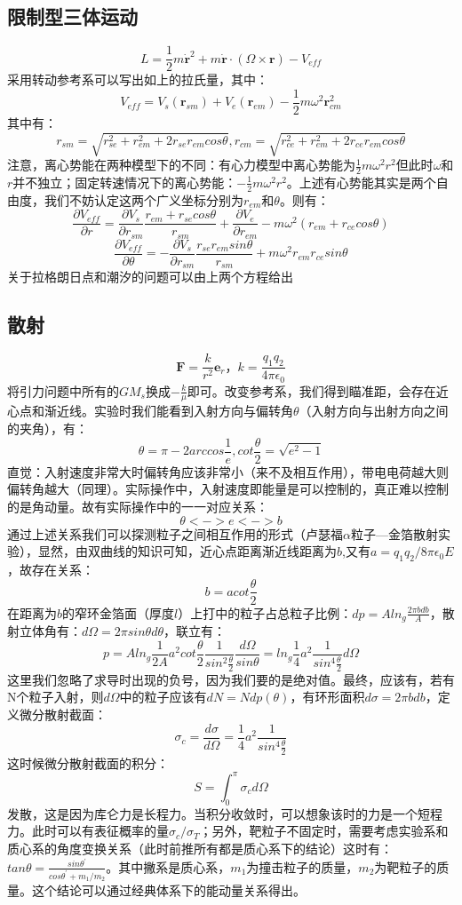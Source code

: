 \documentclass[a4paper, 10pt, openany]{book}%
\begin{document}
    \subsection{限制型三体运动}
    $$L=\frac{1}{2}m\dot{\textbf{r}}^2+m\dot{\textbf{r}}\cdot(\Omega \times{\textbf{r}})-V_{eff}$$
    采用转动参考系可以写出如上的拉氏量，其中：
    $$V_{eff}=V_s(\textbf{r}_{sm})+V_e(\textbf{r}_{em})-\frac{1}{2}m\omega^2\textbf{r}_{cm}^2$$
    其中有：
    $$r_{sm}=\sqrt{r^2_{se}+r^2_{em}+2r_{se}r_{em}cos\theta},r_{cm}=\sqrt{r^2_{ce}+r^2_{em}+2r_{ce}r_{em}cos\theta}$$
    注意，离心势能在两种模型下的不同：有心力模型中离心势能为$\frac{1}{2}m\omega^2r^2$但此时$\omega$和$r$并不独立；固定转速情况下的离心势能：$-\frac{1}{2}m\omega^2r^2$。上述有心势能其实是两个自由度，我们不妨认定这两个广义坐标分别为$r_{em}$和$\theta$。则有：
    $$\frac{\partial V_{eff}}{\partial r}=\frac{\partial V_s}{\partial r_{sm}}\frac{r_{em}+r_{se}cos\theta}{r_{sm}}+\frac{\partial V_e}{\partial r_{em}}-m\omega^2(r_{em}+r_{ce}cos\theta)$$
    $$\frac{\partial V_{eff}}{\partial \theta}=-\frac{\partial V_s}{\partial r_{sm}}\frac{r_{se}r_{em}sin\theta}{r_{sm}}+m\omega^2r_{em}r_{ce}sin\theta$$
    关于拉格朗日点和潮汐的问题可以由上两个方程给出
    \subsection{散射}
    $$\textbf{F}=\frac{k}{r^2}\textbf{e}_r，k=\frac{q_1q_2}{4\pi\epsilon_0}$$
    将引力问题中所有的$GM_s$换成$-\frac{k}{\mu}$即可。改变参考系，我们得到瞄准距，会存在近心点和渐近线。实验时我们能看到入射方向与偏转角$\theta$（入射方向与出射方向之间的夹角），有：
    $$\theta=\pi-2arccos\frac{1}{e},cot\frac{\theta}{2}=\sqrt{e^2-1}$$
    直觉：入射速度非常大时偏转角应该非常小（来不及相互作用），带电电荷越大则偏转角越大（同理）。实际操作中，入射速度即能量是可以控制的，真正难以控制的是角动量。故有实际操作中的一一对应关系：
    $$\theta<->e<->b$$
    通过上述关系我们可以探测粒子之间相互作用的形式（卢瑟福$\alpha$粒子—金箔散射实验），显然，由双曲线的知识可知，近心点距离渐近线距离为$b$,又有$a=q_1q_2/8\pi\epsilon_0E$，故存在关系：
    $$b=acot\frac{\theta}{2}$$
    在距离为$b$的窄环金箔面（厚度$l$）上打中的粒子占总粒子比例：$dp=Aln_g\frac{2\pi bdb}{A}$，散射立体角有：$d\Omega=2\pi sin\theta d\theta$，联立有：
    $$p=Aln_g\frac{1}{2A}a^2cot\frac{\theta}{2}\frac{1}{sin^2\frac{\theta}{2}}\frac{d\Omega}{ sin\theta}=ln_g\frac{1}{4}a^2\frac{1}{sin^4\frac{\theta}{2}}{d\Omega}$$
    这里我们忽略了求导时出现的负号，因为我们要的是绝对值。最终，应该有，若有N个粒子入射，则$d\Omega$中的粒子应该有$dN=Ndp(\theta)$，有环形面积$d\sigma=2\pi bdb$，定义微分散射截面：
    $$\sigma_c=\frac{d\sigma}{d\Omega}=\frac{1}{4}a^2\frac{1}{sin^4\frac{\theta}{2}}$$
    这时候微分散射截面的积分：
    $$S=\int_0^\pi\sigma_cd\Omega$$
    发散，这是因为库仑力是长程力。当积分收敛时，可以想象该时的力是一个短程力。此时可以有表征概率的量$\sigma_c/\sigma_T$；另外，靶粒子不固定时，需要考虑实验系和质心系的角度变换关系（此时前推所有都是质心系下的结论）这时有：$tan\theta=\frac{sin\theta^\prime}{cos\theta^\prime+m_1/m_2}$。其中撇系是质心系，$m_1$为撞击粒子的质量，$m_2$为靶粒子的质量。这个结论可以通过经典体系下的能动量关系得出。
\end{document}
